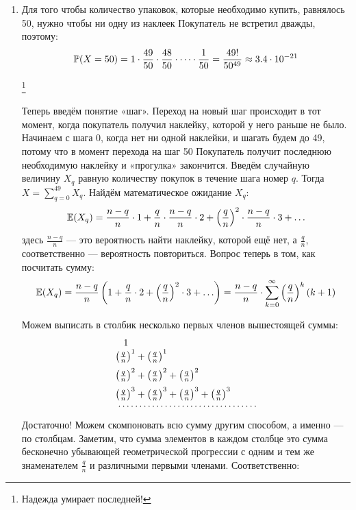 \begin{enumerate}
\begin{enumerate}
\end{enumerate}

\item
Для того чтобы количество упаковок, которые необходимо купить, равнялось 50,
нужно чтобы ни одну из наклеек Покупатель не встретил дважды, поэтому:
\[
\P(X=50) = 1\cdot\frac{49}{50}\cdot\frac{48}{50}\cdot\dots\cdot\frac{1}{50} =
\frac{49!}{50^{49}} \approx 3.4\cdot
10^{-21}
\] \vspace{-1cm}

\hspace{10.5cm}\footnote[2]{Надежда умирает последней!}

Теперь введём понятие «шаг». Переход на новый шаг происходит в тот момент,
когда покупатель получил наклейку, которой у него раньше не было. Начинаем с шага 0,
когда нет ни одной наклейки, и шагать будем до 49, потому что в момент перехода
на шаг 50 Покупатель получит последнюю необходимую наклейку и «прогулка» закончится.
Введём случайную величину $X_q$ равную количеству покупок в течение шага номер $q$.
Тогда $X = \sum \limits_{q=0}^{49}X_q$.  Найдём математическое ожидание $X_q$:
\[
\E(X_q) = \frac{n-q}{n}\cdot 1 + \frac{q}{n}\cdot\frac{n-q}{n}\cdot 2
+ \left(\frac{q}{n}\right)^2\cdot\frac{n-q}{n}\cdot 3 + \ldots
\]
здесь $\frac{n-q}{n}$ —  это вероятность найти наклейку, которой ещё нет,
а $\frac{q}{n}$, соответственно — вероятность повториться. Вопрос теперь в том,
как посчитать сумму:
\[
\E(X_q) = \frac{n-q}{n}\left( 1 + \frac{q}{n}\cdot 2 + \left(\frac{q}{n}\right)^2 \cdot 3
+ \ldots\right) = \frac{n-q}{n}\cdot\sum\limits_{k=0}^{\infty}\left(\frac{q}{n}\right)^k(k+1)
\]

Можем выписать в столбик несколько первых членов вышестоящей суммы:
\[
\begin{array}{l}
\hspace{0.3cm}1 \\
\vspace{0.2cm}
\left(\frac{q}{n}\right)^1  + \left(\frac{q}{n}\right)^1  \\
\vspace{0.2cm}
\left(\frac{q}{n}\right)^2 + \left(\frac{q}{n}\right)^2  + \left(\frac{q}{n}\right)^2 \\
\left(\frac{q}{n}\right)^3 + \left(\frac{q}{n}\right)^3 + \left(\frac{q}{n}\right)^3 + \left(\frac{q}{n}\right)^3 \\
\hspace{0.1cm}\cdots\cdots\cdots\cdots\cdots\cdots\cdots\cdots\cdots\cdots\cdots
\end{array}
\]
Достаточно! Можем скомпоновать всю сумму другим способом, а именно — по столбцам.
Заметим, что сумма элементов в каждом столбце это сумма бесконечно убывающей
геометрической прогрессии с одним и тем же знаменателем $\frac{q}{n}$ и различными
первыми членами. Соответственно:


\end{enumerate}
